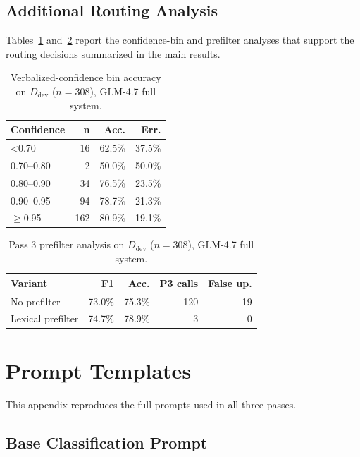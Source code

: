 \documentclass[11pt]{article}
\newcommand{\rev}[1]{#1}
\begin{document}
\subsection{Additional Routing Analysis}
\label{app:routing-diagnostics}

\rev{Tables~\ref{tab:confidence} and~\ref{tab:prefilter} report the confidence-bin and prefilter analyses that support the routing decisions summarized in the main results.}

\begin{table}[h]
\centering
\small
\setlength{\tabcolsep}{6pt}
\begin{tabular}{lrrr}
\toprule
\textbf{Confidence} & \textbf{n} & \textbf{Acc.} & \textbf{Err.} \\
\midrule
<0.70 & 16 & 62.5\% & 37.5\% \\
0.70--0.80 & 2 & 50.0\% & 50.0\% \\
0.80--0.90 & 34 & 76.5\% & 23.5\% \\
0.90--0.95 & 94 & 78.7\% & 21.3\% \\
$\geq$0.95 & 162 & 80.9\% & 19.1\% \\
\bottomrule
\end{tabular}
\caption{\rev{Verbalized-confidence bin accuracy} on $D_{\text{dev}}$ ($n{=}308$), GLM-4.7 full system.}
\label{tab:confidence}
\end{table}

\begin{table}[h]
\centering
\small
\setlength{\tabcolsep}{6pt}
\begin{tabular}{lrrrr}
\toprule
\textbf{Variant} & \textbf{F1} & \textbf{Acc.} & \textbf{P3 calls} & \textbf{False up.} \\
\midrule
No prefilter & 73.0\% & 75.3\% & 120 & 19 \\
Lexical prefilter & 74.7\% & 78.9\% & 3 & 0 \\
\bottomrule
\end{tabular}
\caption{\rev{Pass 3 prefilter analysis} on $D_{\text{dev}}$ ($n{=}308$), GLM-4.7 full system.}
\label{tab:prefilter}
\end{table}

\section{Prompt Templates}
\label{app:prompts}

This appendix reproduces the full prompts used in all three passes.

\subsection{Base Classification Prompt}
\end{document}
